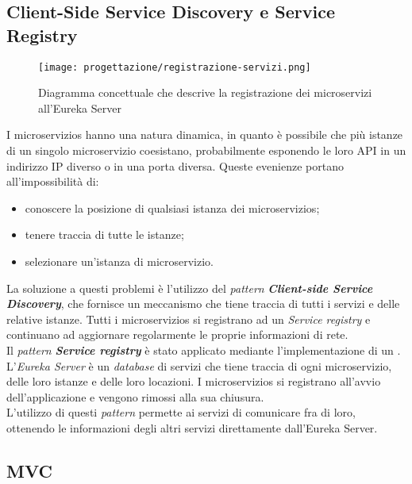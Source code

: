 \subsection{Client-Side Service Discovery e Service Registry}
\label{sub:ServiceRegistry}
\begin{figure}[H] 
    \centering 
    \texttt{[image: progettazione/registrazione-servizi.png]} 
    \caption{Diagramma concettuale che descrive la registrazione dei microservizi all'Eureka Server}
\end{figure}
I \glspl{microservizio} hanno una natura dinamica, in quanto è possibile che più istanze di un singolo \gls{microservizio} coesistano, probabilmente esponendo le loro \gls{API} in un indirizzo \gls{IP} diverso o in una porta diversa. Queste evenienze portano all'impossibilità di: 
\begin{itemize}
    \item conoscere la posizione di qualsiasi istanza dei \glspl{microservizio};
    \item tenere traccia di tutte le istanze;
    \item selezionare un'istanza di \gls{microservizio}.
\end{itemize}
La soluzione a questi problemi è l'utilizzo del \textit{pattern} \textbf{\textit{Client-side Service Discovery}}, che fornisce un meccanismo che tiene traccia di tutti i servizi e delle relative istanze. Tutti i \glspl{microservizio} si registrano ad un \textit{Service registry} e continuano ad aggiornare regolarmente le proprie informazioni di rete.\\
Il \textit{pattern} \textbf{\textit{Service registry}} è stato applicato mediante l'implementazione di un . L'\textit{Eureka Server} è un \textit{database} di servizi che tiene traccia di ogni \gls{microservizio}, delle loro istanze e delle loro locazioni. I \glspl{microservizio} si registrano all'avvio dell'applicazione e vengono rimossi alla sua chiusura.\\
L'utilizzo di questi \textit{pattern}  permette ai servizi di comunicare fra di loro, ottenendo le informazioni degli altri servizi direttamente dall'Eureka Server.
\subsection{MVC}
